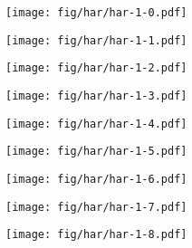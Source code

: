 \documentclass{beamer}
\begin{document}
\begin{frame}
\begin{columns}[t]
\begin{column}{4cm}
  {
    \begin{figure}[h!]
      \centering
      \texttt{[image: fig/har/har-1-0.pdf]}
    \end{figure}
  }
  {
    \begin{figure}[h!]
      \centering
      \texttt{[image: fig/har/har-1-1.pdf]}
    \end{figure}
  }
  {
    \begin{figure}[h!]
      \centering
      \texttt{[image: fig/har/har-1-2.pdf]}
    \end{figure}
  }
  {
    \begin{figure}[h!]
      \centering
      \texttt{[image: fig/har/har-1-3.pdf]}
    \end{figure}
  }
  {
    \begin{figure}[h!]
      \centering
      \texttt{[image: fig/har/har-1-4.pdf]}
    \end{figure}
  }
  {
    \begin{figure}[h!]
      \centering
      \texttt{[image: fig/har/har-1-5.pdf]}
    \end{figure}
  }
  {
    \begin{figure}[h!]
      \centering
      \texttt{[image: fig/har/har-1-6.pdf]}
    \end{figure}
  }
  {
    \begin{figure}[h!]
      \centering
      \texttt{[image: fig/har/har-1-7.pdf]}
    \end{figure}
  }
  {
    \begin{figure}[h!]
      \centering
      \texttt{[image: fig/har/har-1-8.pdf]}
    \end{figure}
  }   
  \end{column}
\end{columns}
\end{frame}
\end{document}
